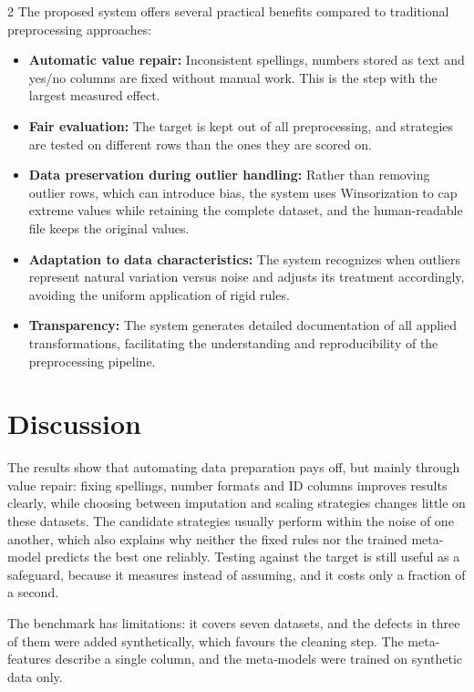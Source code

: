 \documentclass[11pt,a4paper]{article}
\begin{document}
\begin{multicols}{2}
The proposed system offers several practical benefits compared to traditional preprocessing approaches:
\begin{itemize}
    \item \textbf{Automatic value repair:} Inconsistent spellings, numbers stored as text and yes/no columns are fixed without manual work. This is the step with the largest measured effect.
    \item \textbf{Fair evaluation:} The target is kept out of all preprocessing, and strategies are tested on different rows than the ones they are scored on.
    \item \textbf{Data preservation during outlier handling:} Rather than removing outlier rows, which can introduce bias, the system uses Winsorization to cap extreme values while retaining the complete dataset, and the human-readable file keeps the original values.
    \item \textbf{Adaptation to data characteristics:} The system recognizes when outliers represent natural variation versus noise and adjusts its treatment accordingly, avoiding the uniform application of rigid rules.
    \item \textbf{Transparency:} The system generates detailed documentation of all applied transformations, facilitating the understanding and reproducibility of the preprocessing pipeline.
\end{itemize}


\section{Discussion}

The results show that automating data preparation pays off, but mainly through value repair: fixing spellings, number formats and ID columns improves results clearly, while choosing between imputation and scaling strategies changes little on these datasets. The candidate strategies usually perform within the noise of one another, which also explains why neither the fixed rules nor the trained meta-model predicts the best one reliably. Testing against the target is still useful as a safeguard, because it measures instead of assuming, and it costs only a fraction of a second.

The benchmark has limitations: it covers seven datasets, and the defects in three of them were added synthetically, which favours the cleaning step. The meta-features describe a single column, and the meta-models were trained on synthetic data only.


\end{multicols}
\end{document}
